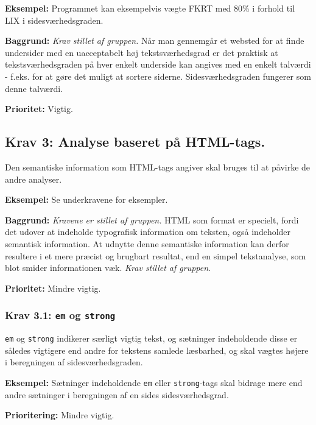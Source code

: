 \documentclass[a4paper,oneside,article, titlepage]{article}
\begin{document}
\begin{description}
\item \textbf{Eksempel:} Programmet kan eksempelvis vægte FKRT med
  80\% i forhold til LIX i sidesværhedsgraden. 
\item \textbf{Baggrund:} \textit{Krav stillet af gruppen.} Når man
  gennemgår et websted for at finde undersider med en uacceptabelt høj
  tekst\-sværhedsgrad er det praktisk at tekst\-sværhedsgraden på hver
  enkelt underside kan angives med en enkelt talværdi - f.eks. for at
  gøre det muligt at sortere siderne. Sidesværhedsgraden fungerer som
  denne talværdi.
\item \textbf{Prioritet:} Vigtig.
\end{description}

\subsection{Krav 3: Analyse baseret på HTML-tags.}
Den semantiske information som HTML-tags angiver skal bruges til at
påvirke de andre analyser.

\begin{description}
\item \textbf{Eksempel:} Se underkravene for eksempler.
\item \textbf{Baggrund:} \textit{Kravene er stillet af gruppen.} HTML
  som format er specielt, fordi det udover at indeholde typografisk
  information om teksten, også indeholder semantisk information. At
  udnytte denne semantiske information kan derfor resultere i et mere
  præcist og brugbart resultat, end en simpel tekstanalyse, som blot
  smider informationen væk. \textit{Krav stillet af gruppen}.
\item \textbf{Prioritet:} Mindre vigtig.
\end{description}

\subsubsection{Krav 3.1: \texttt{em} og \texttt{strong}}

\texttt{em} og \texttt{strong} indikerer særligt vigtig tekst, og
sætninger indeholdende disse er således vigtigere end andre for
tekstens samlede læsbarhed, og skal vægtes højere i beregningen af
sidesværhedsgraden.

\begin{description}
\item \textbf{Eksempel:} Sætninger indeholdende \texttt{em} eller
  \texttt{strong}-tags skal bidrage mere end andre sætninger i
  beregningen af en sides sidesværhedsgrad.
\item \textbf{Prioritering:} Mindre vigtig.
\end{description}
\end{document}
